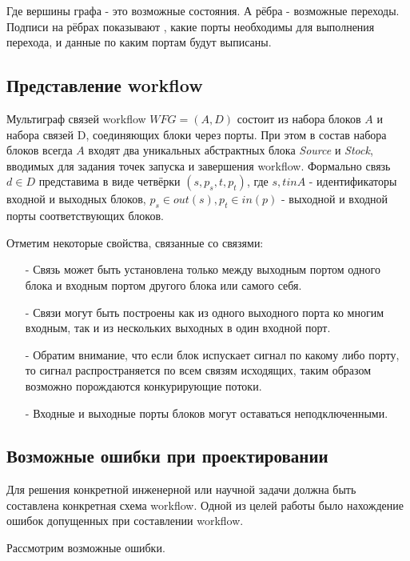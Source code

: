 \documentclass[a4paper,14pt]{article}
\begin{document}
Где вершины графа - это возможные состояния. А рёбра - возможные переходы. Подписи на рёбрах показывают , какие порты необходимы для выполнения перехода, и данные по каким портам будут выписаны.




\subsection{Представление workflow}

 Мультиграф связей workflow $WFG =(A, D)$ состоит из набора блоков $A$ и набора связей D, соединяющих блоки через порты.
 При этом в состав набора блоков всегда $A$ входят два уникальных абстрактных блока \textit{Source} и \textit{Stock}, вводимых для задания точек запуска и завершения workflow.
 Формально связь $d \in D$ представима в виде четвёрки $(s, p_{s}, t, p_{t})$, где $s,t in A$ - идентификаторы входной и выходных блоков,  $ p_{s} \in out(s), p_{t} \in in(p)$ - выходной и входной порты соответствующих блоков. 
 
Отметим некоторые свойства, связанные со связями:
\begin{enumerate}
\item[-] Связь может быть установлена только между выходным портом одного блока и входным портом другого блока или самого себя.
\item[-] Связи могут быть построены как из одного выходного порта ко многим входным, так и из нескольких выходных в один входной порт.
\item[-]Обратим внимание, что если блок испускает сигнал по какому либо порту, то сигнал распространяется по всем связям исходящих, таким образом возможно порождаются конкурирующие потоки.
\item[-] Входные и выходные порты блоков могут оставаться неподключенными.
\end{enumerate} 
 
 
 
 
\subsection{Возможные ошибки при проектировании}
Для решения конкретной инженерной или научной  задачи должна быть составлена конкретная схема workflow.  Одной из целей работы было нахождение ошибок допущенных при составлении workflow.

Рассмотрим возможные ошибки.\\ 
\end{document}
